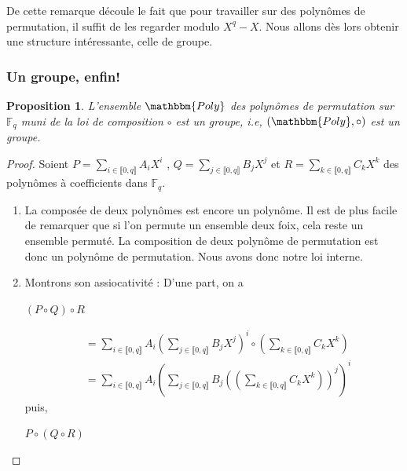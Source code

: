 \documentclass[12pt]{article}
\newcommand{\Fq}{\mathds{F}_q}
\newtheorem{prop}{Proposition}
\theoremstyle{definition}
\begin{document}
De cette remarque découle le fait que pour travailler sur des polynômes de permutation, il suffit de les regarder modulo $X^q - X$. Nous allons dès lors obtenir une structure intéressante, celle de groupe.

\subsubsection{Un groupe, enfin!} 

\begin{prop}
L'ensemble $\mathbbm{Poly}$ des polynômes de permutation sur $\Fq$ muni de la loi de composition $\circ$ est un groupe, i.e, $(\mathbbm{Poly}, \circ)$ est un groupe.
\end{prop}

\begin{proof}
Soient $ P = \displaystyle\sum_{i \in \llbracket 0, q \rrbracket} A_i X^i$ , $Q = \displaystyle\sum_{j \in \llbracket 0, q \rrbracket} B_j X^j$ et $R = \displaystyle\sum_{k \in \llbracket 0, q \rrbracket} C_k X^k$ des polynômes à coefficients dans $\Fq$. \newline
\break
	\begin{enumerate}[label=$\clubsuit$, font=\small  \color{black}]
		\item La composée de deux polynômes est encore un polynôme. Il est de plus facile de remarquer que si l'on permute un ensemble deux foix, cela reste un ensemble permuté. La composition de deux polynôme de permutation est donc un polynôme de permutation. Nous avons donc notre loi interne.
		\item Montrons son assiocativité : \newline
D'une part, on a
			\begin{center} $\left( P\circ Q \right) \circ R$ \end{center}
			\begin{align*} 
&= \displaystyle\sum_{i \in \llbracket 0, q \rrbracket} A_i\left(\displaystyle\sum_{j \in \llbracket 0, q \rrbracket} B_j X^j\right)^i \circ \left(\displaystyle\sum_{k \in \llbracket 0, q \rrbracket} C_k X^k\right) \\ 
&= \displaystyle\sum_{i \in \llbracket 0, q \rrbracket} A_i\left(\displaystyle\sum_{j \in \llbracket 0, q \rrbracket} B_j \left(\left(\displaystyle\sum_{k \in \llbracket 0, q \rrbracket} C_k X^k\right)\right)^j\right)^i
			\end{align*} 
puis, 
			\begin{center} $P\circ \left(Q \circ R\right)$ \end{center}

\end{enumerate}
\end{proof}
\end{document}

